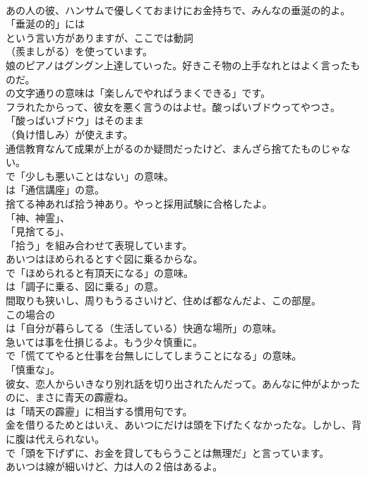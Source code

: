 \documentclass[8pt]{extreport}
\begin{document}
\begin{CJK}{UTF8}{min}
\\	あの人の彼、ハンサムで優しくておまけにお金持ちで、みんなの垂涎の的よ。 
\\	「垂涎の的」には
\\	という言い方がありますが、ここでは動詞
\\	（羨ましがる）を使っています。	
\\	娘のピアノはグングン上達していった。好きこそ物の上手なれとはよく言ったものだ。 
\\	の文字通りの意味は「楽しんでやればうまくできる」です。	
\\	フラれたからって、彼女を悪く言うのはよせ。酸っぱいブドウってやつさ。 
\\	「酸っぱいブドウ」はそのまま 
\\	（負け惜しみ）が使えます。	
\\	通信教育なんて成果が上がるのか疑問だったけど、まんざら捨てたものじゃない。 
\\	で「少しも悪いことはない」の意味。
\\	は「通信講座」の意。	
\\	捨てる神あれば拾う神あり。やっと採用試験に合格したよ。 
\\	「神、神霊」、
\\	「見捨てる」、
\\	「拾う」を組み合わせて表現しています。	
\\	あいつはほめられるとすぐ図に乗るからな。 
\\	で「ほめられると有頂天になる」の意味。
\\	は「調子に乗る、図に乗る」の意。	
\\	間取りも狭いし、周りもうるさいけど、住めば都なんだよ、この部屋。 
\\	この場合の
\\	は「自分が暮らしてる（生活している）快適な場所」の意味。	
\\	急いては事を仕損じるよ。もう少々慎重に。 
\\	で「慌ててやると仕事を台無しにしてしまうことになる」の意味。
\\	「慎重な」。	
\\	彼女、恋人からいきなり別れ話を切り出されたんだって。あんなに仲がよかったのに、まさに青天の霹靂ね。 
\\	は「晴天の霹靂」に相当する慣用句です。	
\\	金を借りるためとはいえ、あいつにだけは頭を下げたくなかったな。しかし、背に腹は代えられない。 
\\	で「頭を下げずに、お金を貸してもらうことは無理だ」と言っています。	
\\	あいつは線が細いけど、力は人の２倍はあるよ。 

\end{CJK}
\end{document}
